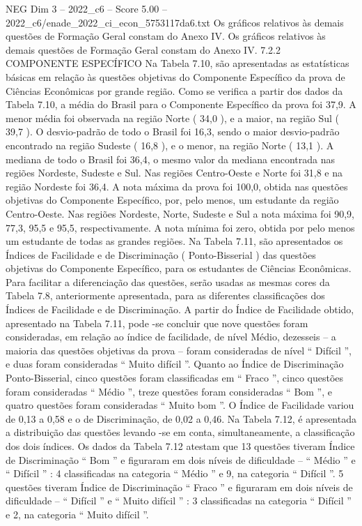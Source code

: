 \begin{textsample}{NEG Dim 3 – 2022\_c6 – Score 5.00 – 2022\_c6/enade\_2022\_ci\_econ\_5753117da6.txt}
Os gráficos relativos às demais questões de Formação Geral constam do Anexo IV.
Os gráficos relativos às demais questões de Formação Geral constam do Anexo IV. 7.2.2 COMPONENTE ESPECÍFICO Na Tabela 7.10, são apresentadas as estatísticas básicas em relação às questões objetivas do Componente Específico da prova de Ciências Econômicas por grande região.
Como se verifica a partir dos dados da Tabela 7.10, a média do Brasil para o Componente Específico da prova foi 37,9.
A menor média foi observada na região Norte ( 34,0 ), e a maior, na região Sul ( 39,7 ).
O desvio-padrão de todo o Brasil foi 16,3, sendo o maior desvio-padrão encontrado na região Sudeste ( 16,8 ), e o menor, na região Norte ( 13,1 ).
A mediana de todo o Brasil foi 36,4, o mesmo valor da mediana encontrada nas regiões Nordeste, Sudeste e Sul.
Nas regiões Centro-Oeste e Norte foi 31,8 e na região Nordeste foi 36,4.
A nota máxima da prova foi 100,0, obtida nas questões objetivas do Componente Específico, por, pelo menos, um estudante da região Centro-Oeste.
Nas regiões Nordeste, Norte, Sudeste e Sul a nota máxima foi 90,9, 77,3, 95,5 e 95,5, respectivamente.
A nota mínima foi zero, obtida por pelo menos um estudante de todas as grandes regiões.
Na Tabela 7.11, são apresentados os Índices de Facilidade e de Discriminação ( Ponto-Bisserial ) das questões objetivas do Componente Específico, para os estudantes de Ciências Econômicas.
Para facilitar a diferenciação das questões, serão usadas as mesmas cores da Tabela 7.8, anteriormente apresentada, para as diferentes classificações dos Índices de Facilidade e de Discriminação.
A partir do Índice de Facilidade obtido, apresentado na Tabela 7.11, pode -se concluir que nove questões foram consideradas, em relação ao índice de facilidade, de nível Médio, dezesseis – a maioria das questões objetivas da prova – foram consideradas de nível “ Difícil ”, e duas foram consideradas “ Muito difícil ”.
Quanto ao Índice de Discriminação Ponto-Bisserial, cinco questões foram classificadas em “ Fraco ”, cinco questões foram consideradas “ Médio ”, treze questões foram consideradas “ Bom ”, e quatro questões foram consideradas “ Muito bom ”.
O Índice de Facilidade variou de 0,13 a 0,58 e o de Discriminação, de 0,02 a 0,46.
Na Tabela 7.12, é apresentada a distribuição das questões levando -se em conta, simultaneamente, a classificação dos dois índices.
Os dados da Tabela 7.12 atestam que 13 questões tiveram Índice de Discriminação “ Bom ” e figuraram em dois níveis de dificuldade – “ Médio ” e “ Difícil ” : 4 classificadas na categoria “ Médio ” e 9, na categoria “ Difícil ”. 5 questões tiveram Índice de Discriminação “ Fraco ” e figuraram em dois níveis de dificuldade – “ Difícil ” e “ Muito difícil ” : 3 classificadas na categoria “ Difícil ” e 2, na categoria “ Muito difícil ”.

\end{textsample}
